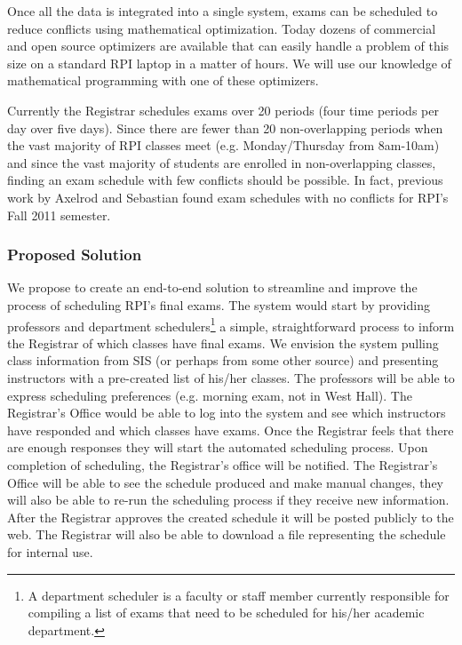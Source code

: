 \documentclass[11pt]{article}
\begin{document}
Once all the data is integrated into a single system, exams can be scheduled to reduce conflicts using mathematical optimization. Today dozens of commercial and open source optimizers are available that can easily handle a problem of this size on a standard RPI laptop in a matter of hours. We will use our knowledge of mathematical programming with one of these optimizers.

Currently the Registrar schedules exams over 20 periods (four time periods per day over five days).  Since there are fewer than 20 non-overlapping periods when the vast majority of RPI classes meet (e.g. Monday/Thursday from 8am-10am) and since the vast majority of students are enrolled in non-overlapping classes, finding an exam schedule with few conflicts should be possible.  In fact, previous work by Axelrod and Sebastian found exam schedules with no conflicts for RPI's Fall 2011 semester.

\subsubsection*{Proposed Solution}

We propose to create an end-to-end solution to streamline and improve the process of scheduling RPI's final exams.  The system would start by providing professors and department schedulers\footnote{A department scheduler is a faculty or staff member currently responsible for compiling a list of exams that need to be scheduled for his/her academic department.} a simple, straightforward process to inform the Registrar of which classes have final exams.  We envision the system pulling class information from SIS (or perhaps from some other source) and presenting instructors with a pre-created list of his/her classes.  The professors will be able to express scheduling preferences (e.g. morning exam, not in West Hall).  The Registrar's Office would be able to log into the system and see which instructors have responded and which classes have exams.  Once the Registrar feels that there are enough responses they will start the automated scheduling process.  Upon completion of scheduling, the Registrar's office will be notified.  The Registrar's Office will be able to see the schedule produced and make manual changes, they will also be able to re-run the scheduling process if they receive new information.  After the Registrar approves the created schedule it will be posted publicly to the web.  The Registrar will also be able to download a  file representing the schedule for internal use.
\end{document}
